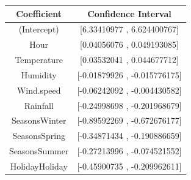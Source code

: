 \documentclass[12 pt]{scrartcl}
\begin{document}
\begin{table}[ht]
\centering
{}
\label{description}
\begin{tabular}{c|c}
\textbf{Coefficient}  & \textbf{Confidence Interval} \\
\hline
(Intercept) & [6.33410977 , 6.624400767]\\
Hour  & [0.04056076 , 0.049193085]\\
Temperature &  [0.03532041 , 0.044677712]\\
Humidity & [-0.01879926 , -0.015776175]\\
Wind.speed  & [-0.06242092 , -0.004430582]\\
Rainfall & [-0.24998698 , -0.201968679]\\
SeasonsWinter &	[-0.89592269 , -0.672676177]\\
SeasonsSpring & [-0.34871434 , -0.190886659]\\
SeasonsSummer  & [-0.27213996 , -0.074521552]\\
HolidayHoliday  & [-0.45900735 , -0.209962611]\\
\end{tabular}
\end{table}
\end{document}
